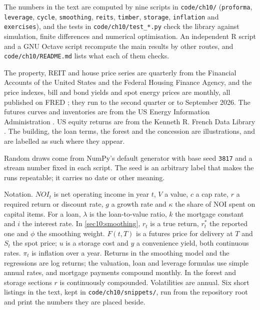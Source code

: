 \begin{chapterrefs}
\begin{keybox}
The numbers in the text are computed by nine scripts in \texttt{code/ch10/} (\texttt{proforma},
\texttt{leverage}, \texttt{cycle}, \texttt{smoothing}, \texttt{reits}, \texttt{timber},
\texttt{storage}, \texttt{inflation} and \texttt{exercises}), and the tests in
\texttt{code/ch10/test\_*.py} check the library against simulation, finite differences and numerical
optimisation. An independent R script and a GNU Octave script recompute the main results by other
routes, and \texttt{code/ch10/README.md} lists what each of them checks.

The property, REIT and house price series are quarterly from the Financial Accounts of the United
States and the Federal Housing Finance Agency, and the price indexes, bill and bond yields and spot
energy prices are monthly, all published on FRED \parencite{fredch10}; they run to the second quarter
or to September 2026. The futures curves and inventories are from the US Energy Information
Administration \parencite{eiach10}. US equity returns are from the Kenneth R. French Data Library
\parencite{frenchlib}. The building, the loan terms, the forest and the concession are illustrations,
and are labelled as such where they appear.

Random draws come from NumPy's default generator with base seed \texttt{3817} and a stream number fixed
in each script. The seed is an arbitrary label that makes the runs repeatable; it carries no date or
other meaning.

Notation. $\mathit{NOI}_t$ is net operating income in year $t$, $V$ a value, $c$ a cap rate, $r$ a
required return or discount rate, $g$ a growth rate and $\kappa$ the share of NOI spent on capital items.
For a loan, $\lambda$ is the loan-to-value ratio, $k$ the mortgage constant and $i$ the interest rate.
In \cref{sec10:smoothing}, $r_t$ is a true return, $r^*_t$ the reported one and $\phi$ the smoothing
weight. $F(t,T)$ is a futures price for delivery at $T$ and $S_t$ the spot price; $u$ is a storage cost
and $y$ a convenience yield, both continuous rates. $\pi_t$ is inflation over a year. Returns in the smoothing model
and the regressions are log returns; the valuation, loan and leverage formulas use simple annual rates,
and mortgage payments compound monthly. In the forest and storage sections $r$ is continuously
compounded. Volatilities are annual. Six short listings in the text, kept in
\texttt{code/ch10/snippets/}, run from the repository root and print the numbers they are placed beside.
\end{keybox}


\end{chapterrefs}
